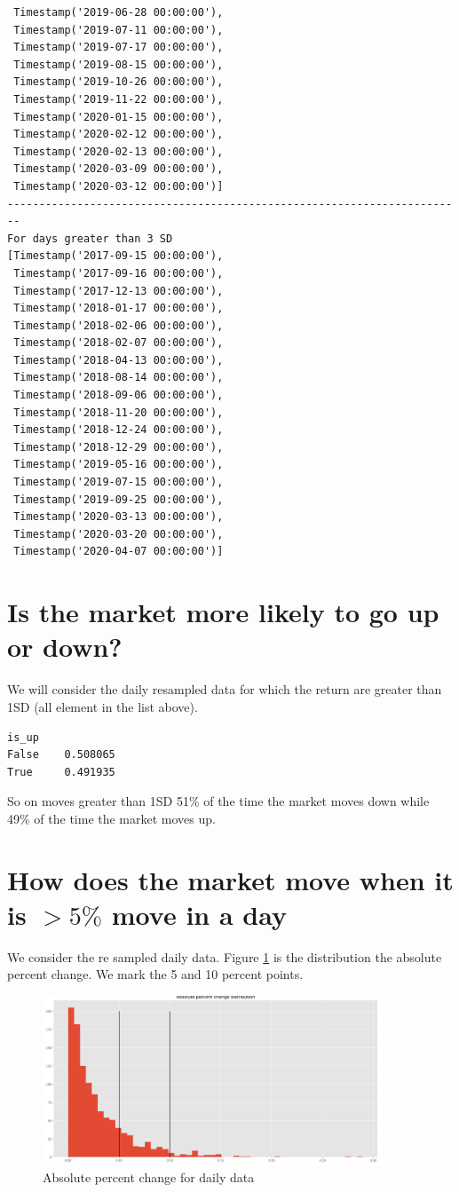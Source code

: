 \begin{verbatim}
 Timestamp('2019-06-28 00:00:00'),
 Timestamp('2019-07-11 00:00:00'),
 Timestamp('2019-07-17 00:00:00'),
 Timestamp('2019-08-15 00:00:00'),
 Timestamp('2019-10-26 00:00:00'),
 Timestamp('2019-11-22 00:00:00'),
 Timestamp('2020-01-15 00:00:00'),
 Timestamp('2020-02-12 00:00:00'),
 Timestamp('2020-02-13 00:00:00'),
 Timestamp('2020-03-09 00:00:00'),
 Timestamp('2020-03-12 00:00:00')]
------------------------------------------------------------------------
For days greater than 3 SD
[Timestamp('2017-09-15 00:00:00'),
 Timestamp('2017-09-16 00:00:00'),
 Timestamp('2017-12-13 00:00:00'),
 Timestamp('2018-01-17 00:00:00'),
 Timestamp('2018-02-06 00:00:00'),
 Timestamp('2018-02-07 00:00:00'),
 Timestamp('2018-04-13 00:00:00'),
 Timestamp('2018-08-14 00:00:00'),
 Timestamp('2018-09-06 00:00:00'),
 Timestamp('2018-11-20 00:00:00'),
 Timestamp('2018-12-24 00:00:00'),
 Timestamp('2018-12-29 00:00:00'),
 Timestamp('2019-05-16 00:00:00'),
 Timestamp('2019-07-15 00:00:00'),
 Timestamp('2019-09-25 00:00:00'),
 Timestamp('2020-03-13 00:00:00'),
 Timestamp('2020-03-20 00:00:00'),
 Timestamp('2020-04-07 00:00:00')]
\end{verbatim}

\section{ Is the market more likely to go up or down?}
We will consider the daily resampled data for which the return are greater than 1SD (all element in the list above).
\begin{verbatim}
is_up
False    0.508065
True     0.491935
\end{verbatim}
So on moves greater than 1SD 51\% of the time the market moves down while 49\% of the time the market moves up.
\section{ How does the market move when it is $>5  \%  $ move in a day}
We consider the re sampled daily data. Figure \ref{fig:pctc} is the distribution the absolute percent change. We mark the 5 and 10 percent points.

\begin{figure}[H]
\center
\includegraphics[width=0.9\textwidth]{fig/pctc.png}
\caption{Absolute percent change for daily data}
\label{fig:pctc}
\end{figure}
 
